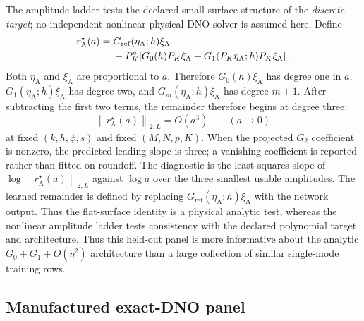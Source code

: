 \documentclass[11pt]{article}
\newcommand{\norm}[1]{\left\lVert #1\right\rVert}
\begin{document}
The amplitude ladder tests the declared small-surface structure of the
\emph{discrete target}; no independent nonlinear physical-DNO solver is
assumed here.  Define
\begin{align}
  r_{\mathrm A}^{\star}(a)
  ={}&G_{\mathrm{ref}}(\eta_{\mathrm A};h)\xi_{\mathrm A}\notag\\
   &-P_K^\circ\!\left[
      G_0(h)P_K\xi_{\mathrm A}
      +G_1(P_K\eta_{\mathrm A};h)P_K\xi_{\mathrm A}
    \right].
  \label{eq:airy-discrete-remainder}
\end{align}
Both $\eta_{\mathrm A}$ and $\xi_{\mathrm A}$ are proportional to $a$.
Therefore $G_0(h)\xi_{\mathrm A}$ has degree one in $a$,
$G_1(\eta_{\mathrm A};h)\xi_{\mathrm A}$ has degree two, and
$G_m(\eta_{\mathrm A};h)\xi_{\mathrm A}$ has degree $m+1$.  After subtracting
the first two terms, the remainder therefore begins at degree three:
\begin{equation}
  \norm{r_{\mathrm A}^{\star}(a)}_{2,L}=O(a^3)
  \qquad(a\to0)
  \label{eq:airy-remainder-scaling}
\end{equation}
at fixed $(k,h,\phi,s)$ and fixed $(M,N,p,K)$.  When the projected $G_2$
coefficient is nonzero, the predicted leading slope is three; a vanishing
coefficient is reported rather than fitted on roundoff.  The diagnostic is
the least-squares slope of $\log\norm{r_{\mathrm A}^{\star}(a)}_{2,L}$
against $\log a$ over the three smallest usable amplitudes.  The learned
remainder is defined by replacing $G_{\mathrm{ref}}(\eta_{\mathrm A};h)
\xi_{\mathrm A}$ with the network output.
Thus the flat-surface identity is a physical analytic test, whereas the
nonlinear amplitude ladder tests consistency with the declared polynomial
target and architecture.
Thus this held-out panel is more informative about the analytic
$G_0+G_1+O(\eta^2)$ architecture than a large collection of similar
single-mode training rows.

\subsection{Manufactured exact-DNO panel}
\label{sec:manufactured}
\end{document}
